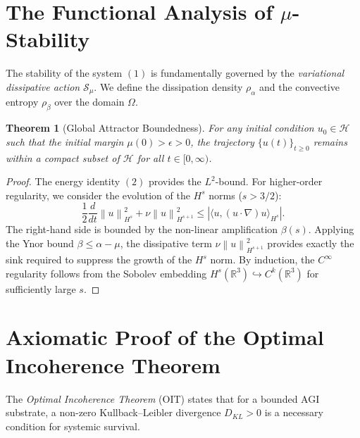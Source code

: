 \documentclass[11pt,a4paper]{amsart}
\newtheorem{theorem}{Theorem}[section]
\newcommand{\alphacoeff}{\ensuremath{\alpha}}
\newcommand{\betacoeff}{\ensuremath{\beta}}
\newcommand{\mumargin}{\ensuremath{\mu}}
\newcommand{\norm}[1]{\left\|#1\right\|}
\newcommand{\inner}[2]{\langle #1, #2 \rangle}
\begin{document}
\section{\texorpdfstring{The Functional Analysis of $\mumargin$-Stability}{The Functional Analysis of Mu-Stability}}
The stability of the system $(1)$ is fundamentally governed by the 
\emph{variational dissipative action} $\mathcal{S}_{\mu}$. We define the 
dissipation density $\rho_{\alpha}$ and the convective entropy $\rho_{\beta}$ 
over the domain $\Omega$. 

\begin{theorem}[Global Attractor Boundedness]
For any initial condition $u_0 \in \mathcal{H}$ such that the initial 
margin $\mumargin(0) > \epsilon > 0$, the trajectory $\{u(t)\}_{t \ge 0}$ 
remains within a compact subset of $\mathcal{H}$ for all $t \in [0, \infty)$.
\end{theorem}

\begin{proof}
The energy identity $(2)$ provides the $L^2$-bound. For higher-order 
regularity, we consider the evolution of the $H^s$ norms ($s > 3/2$):
\begin{equation}
    \frac{1}{2} \frac{d}{dt} \norm{u}_{H^s}^2 + \nu \norm{u}_{H^{s+1}}^2 
    \le \left| \inner{u}{(u \cdot \nabla)u}_{H^s} \right|.
\end{equation}
The right-hand side is bounded by the non-linear amplification $\betacoeff(s)$. 
Applying the Ynor bound $\betacoeff \le \alphacoeff - \mumargin$, the 
dissipative term $\nu \norm{u}_{H^{s+1}}^2$ provides exactly the 
sink required to suppress the growth of the $H^s$ norm. By induction, 
the $C^{\infty}$ regularity follows from the Sobolev embedding 
$H^s(\mathbb{R}^3) \hookrightarrow C^k(\mathbb{R}^3)$ for sufficiently large $s$.
\end{proof}

\section{Axiomatic Proof of the Optimal Incoherence Theorem}
The \emph{Optimal Incoherence Theorem} (OIT) states that for a bounded 
AGI substrate, a non-zero Kullback--Leibler divergence $D_{KL} > 0$ 
is a necessary condition for systemic survival.
\end{document}
